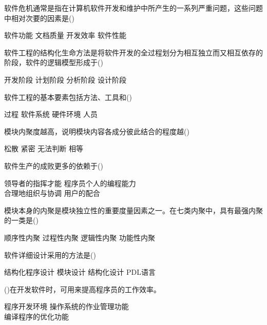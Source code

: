 \documentclass[answers]{exam}
\begin{document}
\begin{questions}
	\question 软件危机通常是指在计算机软件开发和维护中所产生的一系列严重问题，这些问题中相对次要的因素是()\\
	\begin{oneparchoices}
		\choice 软件功能
		\choice 文档质量
		\choice 开发效率
		\correctchoice 软件性能
	\end{oneparchoices}
	\question 软件工程的结构化生命方法是将软件开发的全过程划分为相互独立而又相互依存的阶段，软件的逻辑模型形成于()\\
	\begin{oneparchoices}
		\choice 开发阶段
		\choice 计划阶段
		\correctchoice 分析阶段
		\choice 设计阶段
	\end{oneparchoices}
	\question 软件工程的基本要素包括方法、工具和()\\
	\begin{oneparchoices}
		\correctchoice 过程
		\choice 软件系统
		\choice 硬件环境
		\choice 人员
	\end{oneparchoices}
	\question 模块内聚度越高，说明模块内容各成分彼此结合的程度越()\\
	\begin{oneparchoices}
		\choice 松散
		\correctchoice 紧密
		\choice 无法判断
		\choice 相等
	\end{oneparchoices}
	\question 软件生产的成败更多的依赖于()\\
	\begin{oneparchoices}
		\choice 领导者的指挥才能
		\choice 程序员个人的编程能力\\
		\correctchoice 合理地组织与协调
		\choice 用户的配合
	\end{oneparchoices}
	\question 模块本身的内聚是模块独立性的重要度量因素之一。在七类内聚中，具有最强内聚的一类是()\\
	\begin{oneparchoices}
		\choice 顺序性内聚
		\choice 过程性内聚
		\choice 逻辑性内聚
		\correctchoice 功能性内聚
	\end{oneparchoices}
	\question 软件详细设计采用的方法是()\\
	\begin{oneparchoices}
		\choice 结构化程序设计
		\choice 模块设计
		\correctchoice 结构化设计
		\choice PDL语言
	\end{oneparchoices}
	\question ()在开发软件时，可用来提高程序员的工作效率。\\
	\begin{oneparchoices}
		\correctchoice 程序开发环境
		\choice 操作系统的作业管理功能\\
		\choice 编译程序的优化功能

\end{oneparchoices}
\end{questions}
\end{document}
